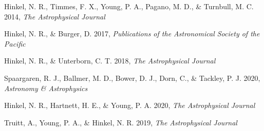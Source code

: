 \documentclass[12pt]{article}
\begin{document}
\begin{thebibliography}{}

Hinkel, N. R., Timmes, F. X., Young, P. A., Pagano, M. D., \& Turnbull, M. C. 2014, \textit{The Astrophysical Journal}

Hinkel, N. R., \& Burger, D. 2017, \textit{Publications of the Astronomical Society of the Pacific}

Hinkel, N. R., \& Unterborn, C. T. 2018, \textit{The Astrophysical Journal}

Spaargaren, R. J., Ballmer, M. D., Bower, D. J., Dorn, C., \& Tackley, P. J. 2020, \textit{Astronomy \& Astrophysics}

Hinkel, N. R., Hartnett, H. E., \& Young, P. A. 2020, \textit{The Astrophysical Journal}

Truitt, A., Young, P. A., \& Hinkel, N. R. 2019, \textit{The Astrophysical Journal}

\end{thebibliography}
\end{document}
